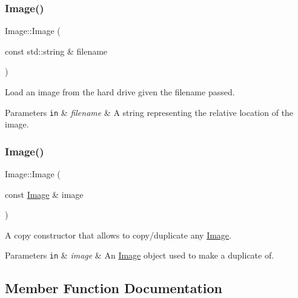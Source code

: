\subsubsection{\texorpdfstring{Image()}{Image()}\hspace{0.1cm}{\footnotesize\ttfamily [5/6]}}
{\footnotesize\ttfamily Image\+::\+Image (\begin{DoxyParamCaption}\item[{const std\+::string \&}]{filename }\end{DoxyParamCaption})}



Load an image from the hard drive given the filename passed. 


\begin{DoxyParams}[1]{Parameters}
\mbox{\tt in}  & {\em filename} & A string representing the relative location of the image. \\
\hline
\end{DoxyParams}
\mbox{\label{classImage_a34410a36b132ab597a8878d45facc89a}} 
\subsubsection{\texorpdfstring{Image()}{Image()}\hspace{0.1cm}{\footnotesize\ttfamily [6/6]}}
{\footnotesize\ttfamily Image\+::\+Image (\begin{DoxyParamCaption}\item[{const \hyperlink{classImage}{Image} \&}]{image }\end{DoxyParamCaption})}



A copy constructor that allows to copy/duplicate any \hyperlink{classImage}{Image}. 


\begin{DoxyParams}[1]{Parameters}
\mbox{\tt in}  & {\em image} & An \hyperlink{classImage}{Image} object used to make a duplicate of. \\
\hline
\end{DoxyParams}


\subsection{Member Function Documentation}
\mbox{\label{classImage_aec11158c35b24ba60a835c877d791b36}} 
